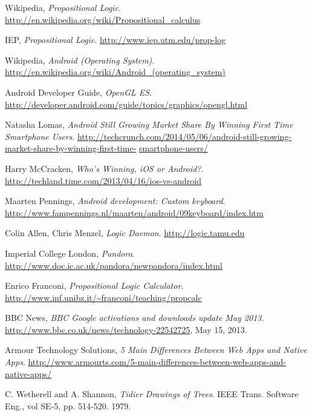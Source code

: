 \documentclass[draft]{report}
\begin{document}
\begin{thebibliography}{9}

  Wikipedia,
  \emph{Propositional Logic}.
  \url{http://en.wikipedia.org/wiki/Propositional_calculus}

  IEP,
  \emph{Propositional Logic}.
  \url{http://www.iep.utm.edu/prop-log}

  Wikipedia,
  \emph{Android (Operating System)}.
  \url{http://en.wikipedia.org/wiki/Android_(operating_system)}

  Android Developer Guide,
  \emph{OpenGL ES}.
  \url{http://developer.android.com/guide/topics/graphics/opengl.html}

  Natasha Lomas,
  \emph{Android Still Growing Market Share By Winning First Time Smartphone Users}.
  \url{http://techcrunch.com/2014/05/06/android-still-growing-market-share-by-winning-first-time-}
  \url{smartphone-users/}

  Harry McCracken,
  \emph{Who’s Winning, iOS or Android?}.
  \url{http://techland.time.com/2013/04/16/ios-vs-android}

  Maarten Pennings,
  \emph{Android development: Custom keyboard}.
  \url{http://www.fampennings.nl/maarten/android/09keyboard/index.htm}

  Colin Allen, Chris Menzel,
  \emph{Logic Daemon}.
  \url{http://logic.tamu.edu}

  Imperial College London,
  \emph{Pandora}.
  \url{http://www.doc.ic.ac.uk/pandora/newpandora/index.html}

  Enrico Franconi,
  \emph{Propositional Logic Calculator}.
  \url{http://www.inf.unibz.it/~franconi/teaching/propcalc}

  BBC News,
  \emph{BBC Google activations and downloads update May 2013}. 
  \url{http://www.bbc.co.uk/news/technology-22542725},
  May 15, 2013.

  Armour Technology Solutions,
  \emph{5 Main Differences Between Web Apps and Native Apps}.
  \url{http://www.armourts.com/5-main-differences-between-web-apps-and-native-apps/}

  C. Wetherell and A. Shannon,
  \emph{Tidier Drawings of Trees}.
  IEEE Trans. Software Eng., 
  vol SE-5, pp. 514-520.
  1979.


\end{thebibliography}
\end{document}
